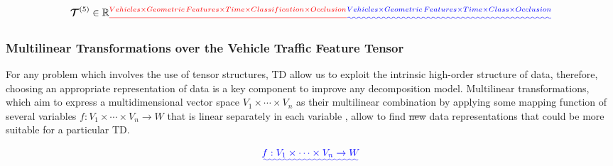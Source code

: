 \documentclass[sensors,article,submit,moreauthors,pdftex]{Definitions/mdpi}
\newcommand{\mathten}[1]{\boldsymbol{\mathbf{\mathcal{\MakeUppercase{#1}}}}}
\providecommand{\DIFadd}[1]{{\protect\color{blue}\uwave{#1}}} %
\providecommand{\DIFdel}[1]{{\protect\color{red}\sout{#1}}}                      %
\providecommand{\DIFaddbegin}{} %
\providecommand{\DIFaddend}{} %
\providecommand{\DIFdelbegin}{} %
\providecommand{\DIFdelend}{} %
\begin{document}
\begin{equation}
\mathten{T}^{(5)} \in \mathbb{R}\DIFdelbegin \DIFdel{^{Vehicles \times Geometric\,Features \times Time \times Classification \times Occlusion}
}\DIFdelend \DIFaddbegin \DIFadd{^{Vehicles \times Geometric\,Features \times Time \times Class \times Occlusion}
}\DIFaddend \label{eq:vtf5model}
\end{equation}

\subsubsection{Multilinear Transformations over the Vehicle Traffic Feature Tensor}
For any problem which involves the use of tensor structures, TD allow us to  exploit the intrinsic high-order structure of data, therefore, choosing an appropriate representation of data is a key component to improve any decomposition model. Multilinear transformations, which aim to express a multidimensional vector space $V_1 \times \cdots \times V_n$ as their multilinear combination by applying some mapping function of several variables \DIFdelbegin \DIFdel{$f : V_1 \times \cdots \times V_n \rightarrow W$ }\DIFdelend that is linear separately in each variable \DIFaddbegin \DIFadd{(see Equation \ref{eq:mltransform})}\DIFaddend , allow to find \DIFdelbegin \DIFdel{new }\DIFdelend \DIFaddbegin \DIFadd{other }\DIFaddend data representations that could be more suitable for a particular TD.


\DIFaddbegin \begin{equation}
\DIFadd{f : V_1 \times \cdots \times V_n \rightarrow W
\label{eq:mltransform}
}\end{equation}
\end{document}
